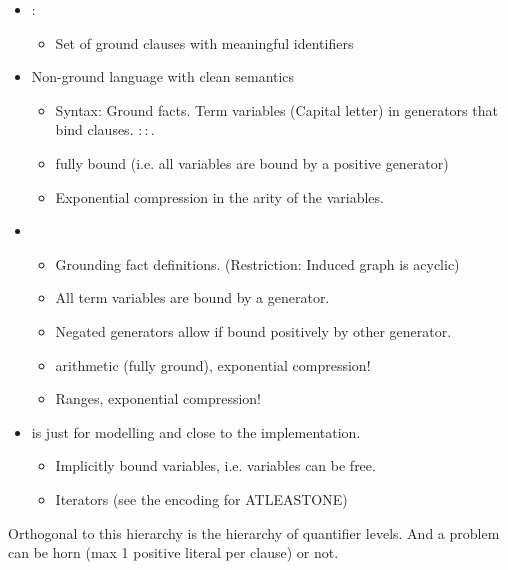 \documentclass[runningheads]{llncs}
\begin{document}
\begin{itemize}
    \item \bflat: 
        \begin{itemize}
            \item Set of ground clauses with meaningful identifiers 
        \end{itemize}
    \item \bcore Non-ground language with clean semantics
        \begin{itemize}
            \item Syntax: Ground facts. Term variables (Capital letter) in generators that bind clauses. $::$.
            \item fully bound (i.e. all variables are bound by a positive generator) 
            \item Exponential compression in the arity of the variables. 
        \end{itemize}
    \item \bfull 
        \begin{itemize}
            \item Grounding fact definitions. (Restriction: Induced graph is acyclic)
            \item All term variables are bound by a generator. 
            \item Negated generators allow if bound positively by other generator. 
            \item arithmetic (fully ground), exponential compression!
            \item Ranges, exponential compression!
        \end{itemize}
    \item \bnice is just for modelling and close to the implementation. 
        \begin{itemize}
            \item Implicitly bound variables, i.e. variables can be free. 
            \item Iterators (see the encoding for ATLEASTONE)
        \end{itemize}
\end{itemize}

Orthogonal to this hierarchy is the hierarchy of quantifier levels. 
And a problem can be horn (max 1 positive literal per clause) or not. 

\subsection{\bflat}
\end{document}
